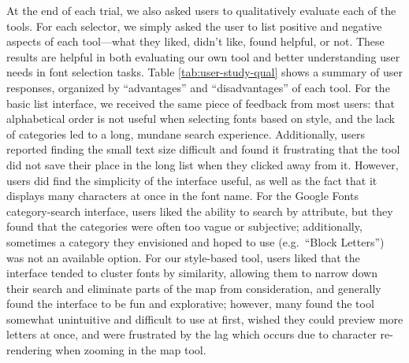 At the end of each trial, we also asked users to qualitatively evaluate each of the tools. For each selector, we simply asked the user to list positive and negative aspects of each tool---what they liked, didn't like, found helpful, or not. These results are helpful in both evaluating our own tool and better understanding user needs in font selection tasks. Table \ref{tab:user-study-qual} shows a summary of user responses, organized by ``advantages'' and ``disadvantages'' of each tool. For the basic list interface, we received the same piece of feedback from most users: that alphabetical order is not useful when selecting fonts based on style, and the lack of categories led to a long, mundane search experience. Additionally, users reported finding the small text size difficult and found it frustrating that the tool did not save their place in the long list when they clicked away from it. However, users did find the simplicity of the interface useful, as well as the fact that it displays many characters at once in the font name. For the Google Fonts category-search interface, users liked the ability to search by attribute, but they found that the categories were often too vague or subjective; additionally, sometimes a category they envisioned and hoped to use (e.g.\ ``Block Letters'') was not an available option. For our style-based tool, users liked that the interface tended to cluster fonts by similarity, allowing them to narrow down their search and eliminate parts of the map from consideration, and generally found the interface to be fun and explorative; however, many found the tool somewhat unintuitive and difficult to use at first, wished they could preview more letters at once, and were frustrated by the lag which occurs due to character re-rendering when zooming in the map tool.

